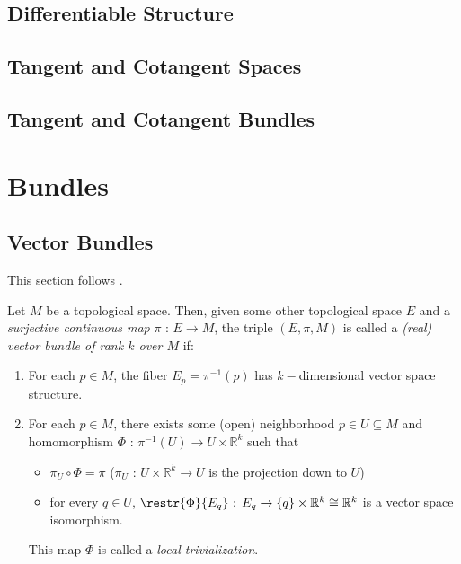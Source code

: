 \documentclass[11pt]{article}
\begin{document}
\subsection{Differentiable Structure}

\subsection{Tangent and Cotangent Spaces}

\subsection{Tangent and Cotangent Bundles}

\newpage
\section{Bundles}

\subsection{Vector Bundles}
This section follows \cite{LeeSM}.

\begin{definition}
    Let $M$ be a topological space. Then, given some other topological space $E$ and a \textit{surjective continuous map} $\pi \text{ : } E \rightarrow M$, the triple $(E, \pi, M)$ is called a \textit{(real) vector bundle of rank $k$ over $M$} if: 
    \begin{enumerate}[label=(\alph*)]
        \item For each $p \in M$, the fiber $E_p = \pi^{-1}(p)$ has $k-$dimensional vector space structure.
        \item For each $p \in M$, there exists some (open) neighborhood $ p \in U \subseteq M$ and homomorphism $\Phi \text{ : } \pi^{-1}(U) \rightarrow U \times \mathbb{R}^k$ such that 
        \begin{itemize}
            \item $\pi_U \circ \Phi = \pi$ ($\pi_U \text{ : } U \times \mathbb{R}^k \rightarrow U$ is the projection down to $U$)
            \item for every $q \in U$, $\restr{\Phi}{E_q} \text{ : } E_q \rightarrow \{q\} \times \mathbb{R}^k \cong \mathbb{R}^k$ is a vector space isomorphism.
        \end{itemize}
        This map $\Phi$ is called a \textit{local trivialization}.
    \end{enumerate}
\end{definition}
\end{document}
